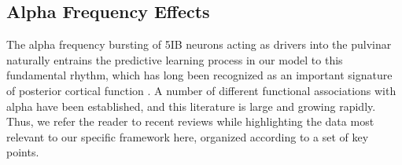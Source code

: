 \documentclass[11pt,twoside]{article}
\newif\myifpdf
\begin{document}
\subsection{Alpha Frequency Effects}

The alpha frequency bursting of 5IB neurons acting as drivers into the pulvinar naturally entrains the predictive learning process in our model to this fundamental rhythm, which has long been recognized as an important signature of posterior cortical function \citep{Berger29,Walter53,NunnOsselton74,VarelaToroJohnEtAl81,VanRullenKoch03}.  A number of different functional associations with alpha have been established, and this literature is large and growing rapidly.  Thus, we refer the reader to recent reviews \citep{JensenBonnefondMarshallEtAl15,VanRullen16,ClaytonYeungKadosh18,FosterAwh19} while highlighting the data most relevant to our specific framework here, organized according to a set of key points.
\end{document}

